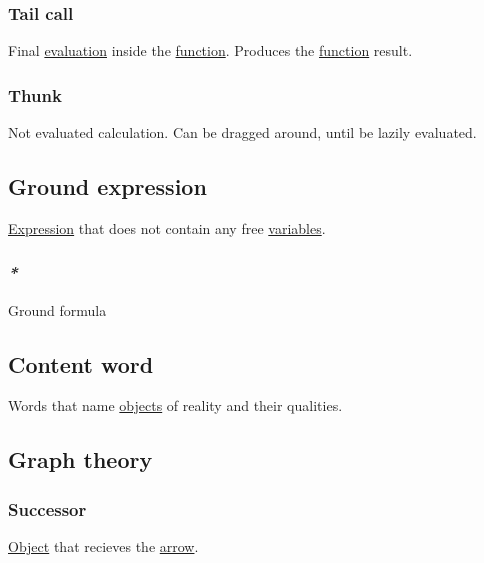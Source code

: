\documentclass[11pt]{article}
\begin{document}
\subsubsection{\label{org5cfc702}Tail call}
\label{sec:org9bd179f}
Final \hyperref[org5445907]{evaluation} inside the \hyperref[orgeb5cddb]{function}. Produces the \hyperref[orgeb5cddb]{function} result.\\

\subsubsection{\label{org1b31aa9}Thunk}
\label{sec:org406a2ab}
Not evaluated calculation. Can be dragged around, until be lazily evaluated.\\

\subsection{\label{org0a594b3}Ground expression}
\label{sec:org7913181}
\hyperref[org667db83]{Expression} that does not contain any free \hyperref[orgd3f3ade]{variables}.\\

\subsubsection{\emph{*}}
\label{sec:orgcc5ebbb}

\label{org6a7ea93}Ground formula\\

\subsection{\label{org0b96517}Content word}
\label{sec:org242a5e0}
Words that name \hyperref[orge0f000f]{objects} of reality and their qualities.\\


\subsection{\label{org986e014}Graph theory}
\label{sec:orgb0b7398}
\subsubsection{\label{org008a3bd}Successor}
\label{sec:org087426e}
\hyperref[org025aac8]{Object} that recieves the \hyperref[org5b6e6e9]{arrow}.\\
\end{document}
